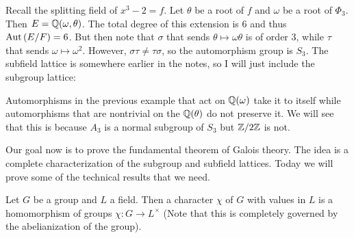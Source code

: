 \message{ !name(notes.tex)}\documentclass[10pt, twoside]{article}
\begin{document}
    \begin{exm}
        Recall the splitting field of $x^3-2 = f$. Let $\theta$ be a root of $f$ and $\omega$ be a root of $\Phi_3$. Then $E = \mathbb{Q}(\omega, \theta)$. The total degree of this extension is $6$ and thus $\operatorname{Aut}{(E/F)} = 6$. But then note that $\sigma$ that sends $\theta \mapsto \omega\theta$ is of order $3$, while $\tau$ that sends $\omega \mapsto \omega^2$. However, $\sigma\tau \neq \tau\sigma$, so the automorphism group is $S_3$. The subfield lattice is somewhere earlier in the notes, so I will just include the subgroup lattice:
        \begin{center}
        \end{center}
    \end{exm}

    \begin{rmk}
        Automorphisms in the previous example that act on $\mathbb{Q}(\omega)$ take it to itself while automorphisms that are nontrivial on the $\mathbb{Q}(\theta)$ do not preserve it. We will see that this is because $A_3$ is a normal subgroup of $S_3$ but $\mathbb{Z}/2\mathbb{Z}$ is not.
    \end{rmk}

    Our goal now is to prove the fundamental theorem of Galois theory. The idea is a complete characterization of the subgroup and subfield lattices. Today we will prove some of the technical results that we need.

    \begin{defn}[Character]
        Let $G$ be a group and $L$ a field. Then a character $\chi$ of $G$ with values in $L$ is a homomorphism of groups $\chi: G \rightarrow L^{\times}$ (Note that this is completely governed by the abelianization of the group).
    \end{defn}
\end{document}
